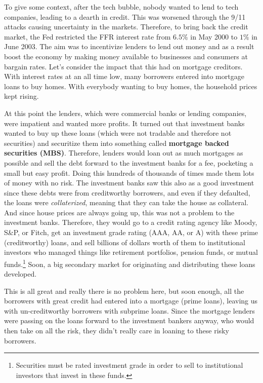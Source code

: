 \documentclass{article}
\begin{document}
  To give some context, after the tech bubble, nobody wanted to lend to tech companies, leading to a dearth in credit. This was worsened through the 9/11 attacks causing uncertainty in the markets. Therefore, to bring back the credit market, the Fed restricted the FFR interest rate from $6.5\%$ in May 2000 to $1\%$ in June 2003. The aim was to incentivize lenders to lend out money and as a result boost the economy by making money available to businesses and consumers at bargain rates. Let's consider the impact that this had on mortgage creditors. With interest rates at an all time low, many borrowers entered into mortgage loans to buy homes. With everybody wanting to buy homes, the household prices kept rising. 

  At this point the lenders, which were commercial banks or lending companies, were impatient and wanted more profits. It turned out that investment banks wanted to buy up these loans (which were not tradable and therefore not securities) and securitize them into something called \textbf{mortgage backed securities (MBS)}. Therefore, lenders would loan out as much mortgages as possible and sell the debt forward to the investment banks for a fee, pocketing a small but easy profit. Doing this hundreds of thousands of times made them lots of money with no risk. The investment banks saw this also as a good investment since these debts were from creditworthy borrowers, and even if they defaulted, the loans were \textit{collaterized}, meaning that they can take the house as collateral. And since house prices are always going up, this was not a problem to the investment banks. Therefore, they would go to a credit rating agency like Moody, S\&P, or Fitch, get an investment grade rating (AAA, AA, or A) with these prime (creditworthy) loans, and sell billions of dollars worth of them to institutional investors who managed things like retirement portfolios, pension funds, or mutual funds.\footnote{Securities must be rated investment grade in order to sell to institutional investors that invest in these funds. } Soon, a big secondary market for originating and distributing these loans developed. 

  This is all great and really there is no problem here, but soon enough, all the borrowers with great credit had entered into a mortgage (prime loans), leaving us with un-creditworthy borrowers with subprime loans. Since the mortgage lenders were passing on the loans forward to the investment bankers anyway, who would then take on all the risk, they didn't really care in loaning to these risky borrowers. 
\end{document}
